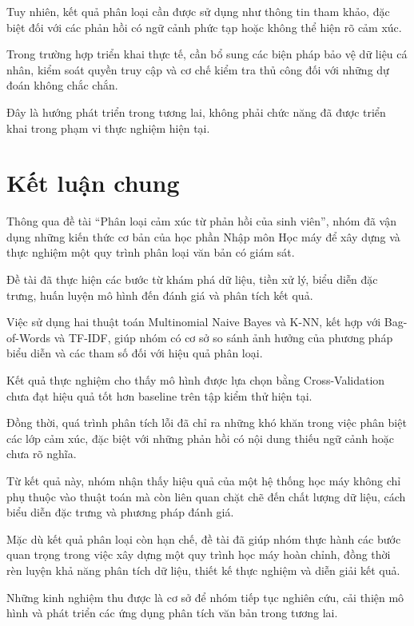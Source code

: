 Tuy nhiên, kết quả phân loại cần
được sử dụng như thông tin tham
khảo, đặc biệt đối với các phản
hồi có ngữ cảnh phức tạp hoặc
không thể hiện rõ cảm xúc.

Trong trường hợp triển khai thực tế,
cần bổ sung các biện pháp bảo vệ
dữ liệu cá nhân, kiểm soát quyền
truy cập và cơ chế kiểm tra thủ
công đối với những dự đoán
không chắc chắn.

Đây là hướng phát triển trong
tương lai, không phải chức năng
đã được triển khai trong phạm
vi thực nghiệm hiện tại.



\section{Kết luận chung}

Thông qua đề tài ``Phân loại cảm xúc từ phản hồi
của sinh viên'', nhóm đã vận dụng những kiến thức
cơ bản của học phần Nhập môn Học máy để xây dựng
và thực nghiệm một quy trình phân loại văn bản
có giám sát.

Đề tài đã thực hiện các bước từ khám phá dữ liệu,
tiền xử lý, biểu diễn đặc trưng, huấn luyện
mô hình đến đánh giá và phân tích kết quả.

Việc sử dụng hai thuật toán Multinomial Naive Bayes
và K-NN, kết hợp với Bag-of-Words và TF-IDF,
giúp nhóm có cơ sở so sánh ảnh hưởng của phương
pháp biểu diễn và các tham số đối với hiệu quả
phân loại.

Kết quả thực nghiệm cho thấy mô hình được lựa
chọn bằng Cross-Validation chưa đạt hiệu quả
tốt hơn baseline trên tập kiểm thử hiện tại.

Đồng thời, quá trình phân tích lỗi đã chỉ ra
những khó khăn trong việc phân biệt các lớp
cảm xúc, đặc biệt với những phản hồi có
nội dung thiếu ngữ cảnh hoặc chưa rõ nghĩa.

Từ kết quả này, nhóm nhận thấy hiệu quả của
một hệ thống học máy không chỉ phụ thuộc vào
thuật toán mà còn liên quan chặt chẽ đến chất
lượng dữ liệu, cách biểu diễn đặc trưng và
phương pháp đánh giá.

Mặc dù kết quả phân loại còn hạn chế,
đề tài đã giúp nhóm thực hành các bước
quan trọng trong việc xây dựng một
quy trình học máy hoàn chỉnh, đồng thời
rèn luyện khả năng phân tích dữ liệu,
thiết kế thực nghiệm và diễn giải kết quả.

Những kinh nghiệm thu được là cơ sở để
nhóm tiếp tục nghiên cứu, cải thiện
mô hình và phát triển các ứng dụng
phân tích văn bản trong tương lai.
